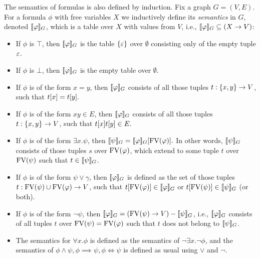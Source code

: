 The semantics of formulas is also defined by induction.
Fix a graph $G=(V,E)$. 
For a formula $\phi$ with free variables $X$ we inductively define its \emph{semantics} in $G$, denoted $[\![\varphi]\!]_G$, which is a table
over $X$ with values from $V$, i.e., $[\![\varphi]\!]_G\subseteq (X\to V)$:
\begin{itemize}
	\item If $\phi$ is $\top$, then 
	$[\![\varphi]\!]_G$ is the table $\{\varepsilon\}$ over $\emptyset$ consisting only of the empty tuple $\varepsilon$.
	
	\item If $\phi$ is $\bot$, then 
	$[\![\varphi]\!]_G$ is the empty table over $\emptyset$.	
	
	\item If $\phi$ is of the form $x=y$, then
	$[\![\varphi]\!]_G$ consists of all those tuples $t:\{x,y\}\to V$,
	such that $t[x]=t[y].$

	\item If $\phi$ is of the form $xy\in E$, then
	$[\![\varphi]\!]_G$ consists of all those tuples $t:\{x,y\}\to V$,
	such that $t[x]t[y]\in E.$
		
	\item If $\phi$ is of the form $\exists x.\psi$, then
	$[\![\psi]\!]_G=[\![\varphi]\!]_G[\textrm{FV}(\varphi)].$ In other words,
	$[\![\psi]\!]_G$ consists of those tuples $s$ over $\textrm{FV}(\varphi)$, which extend to some tuple $t$ over $\textrm{FV}(\psi)$ such that $t\in [\![\psi]\!]_G$.
	
	\item If $\phi$ is of the form $\psi\lor \gamma$, then $[\![\varphi]\!]_G$
	is defined as the set of those tuples $t:\textrm{FV}(\psi)\cup\textrm{FV}(\varphi)\to V$,
	such that $t[{\textrm{FV}(\varphi)}]\in [\![\varphi]\!]_G$ or $t[{\textrm{FV}(\psi)}]\in [\![\psi]\!]_G$ (or both).
	
	\item If $\phi$ is of the form $\neg\psi$, then $[\![\varphi]\!]_G=(\textrm{FV}(\psi)\to V) - [\![\psi]\!]_G$, i.e., 
	$[\![\varphi]\!]_G$ consists of all tuples $t$ over $\textrm{FV}(\psi)=\textrm{FV}(\varphi)$ such that $t$ does not belong to $[\![\psi]\!]_G$.
	

\item The semantics for $\forall x.\phi$ is defined as the semantics of $\neg\exists x.\neg\phi$, and the semantics of $\phi\land \psi,\phi\implies\psi,\phi\iff\psi$ is defined as usual using $\lor$ and $\neg$.
\end{itemize}


